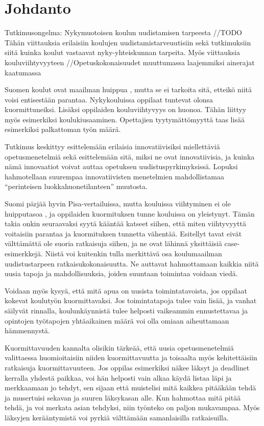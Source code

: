 \documentclass[utf8,bachelor]{gradu3}
\begin{document}
\mainmatter

\chapter{Johdanto}

Tutkimusongelma: Nykymuotoisen koulun uudistamisen tarpeesta
//TODO Tähän viittauksia erilaisiin koulujen uudistamistarveuutisiin sekä tutkimuksiin siitä kuinka koulut vastaavat nyky-yhteiskunnan tarpeita. Myös viittauksia kouluviihtyvyyteen
//Opetuskokonaisuudet muuttumassa laajemmiksi ainerajat kaatumassa

Suomen koulut ovat maailman huippua \parencite[][]{koulutHuippua}, mutta se ei tarkoita sitä, etteikö niitä voisi entisestään parantaa. Nykykouluissa oppilaat tuntevat olonsa kuormittuneiksi. \parencite [][]{oppilaidenKuormitus} Lisäksi oppilaiden kouluviihtyvyys on huonoa. Tähän liittyy myös esimerkiksi koulukiusaaminen. \parencite[][]{vakivalta} Opettajien tyytymättömyyttä taas lisää esimerkiksi palkattoman työn määrä. \parencite[][]{palkatonTyo}

Tutkimus keskittyy esittelemään erilaisia innovatiivisiksi miellettäviä opetusmenetelmiä sekä esittelemään sitä, miksi ne ovat innovatiivisia, ja kuinka nämä innovaatiot voivat auttaa opetuksen uudistuspyrkimyksissä. Lopuksi hahmotellaan suurempaa innovatiivisten menetelmien mahdollistamaa “perinteisen luokkahuonetilanteen” muutosta.

Suomi pärjää hyvin Pisa-vertailuissa, mutta kouluissa viihtyminen ei ole huipputasoa \parencite[][]{kouluViihtyvyys}, ja oppilaiden kuormituksen tunne kouluissa on yleistynyt. \parencite [][]{oppilaidenKuormitus} Tämän takia onkin seuraavaksi syytä kääntää katseet siihen, että miten viihtyvyyttä voitaisiin parantaa ja kuormituksen tunnetta vähentää. Esitellyt tavat eivät välttämättä ole suoria ratkaisuja siihen, ja ne ovat lähinnä yksittäisiä case-esimerkkejä. Niistä voi kuitenkin tulla merkittävä osa koulumaailman uudistustarpeen ratkaisukokonaisuutta. Ne auttavat hahmottamaan kaikkia niitä uusia tapoja ja mahdollisuuksia, joiden suuntaan toimintaa voidaan viedä. 

Voidaan myös kysyä, että mitä apua on uusista toimintatavoista, jos oppilaat kokevat koulutyön kuormittavaksi. Jos toimintatapoja tulee vain lisää, ja vanhat säilyvät rinnalla, koulunkäynnistä tulee helposti vaikeammin ennustettavaa ja opintojen työtapojen yhtäaikainen määrä voi olla omiaan aiheuttamaan hämmennystä.

Kuormittavuuden kannalta olisikin tärkeää, että uusia opetusmenetelmiä valittaessa huomioitaisiin niiden kuormittavuutta ja toisaalta myös kehitettäisiin ratkaisuja kuormittavuuteen. Jos oppilas esimerkiksi näkee läksyt ja deadlinet kerralla yhdestä paikkaa, voi hän helposti vain alkaa käydä listaa läpi ja merkkaamaan jo tehdyt, sen sijaan että muistelisi mitä kaikkea pitääkään tehdä ja musertuisi sekavan ja suuren läksykasan alle. Kun hahmottaa mitä pitää tehdä, ja voi merkata asian tehdyksi, niin työnteko on paljon mukavampaa. Myös läksyjen kerääntymistä voi pyrkiä välttämään samanlaisilla ratkaisuilla.
\end{document}
